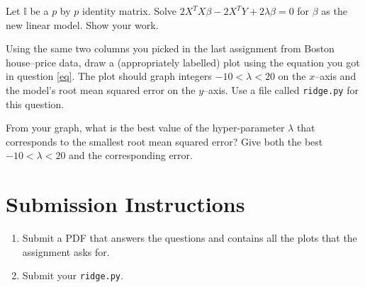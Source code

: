 \documentclass{homework}
\begin{document}
\question\label{eq} Let $\mathbb{I}$ be a $p$ by $p$ identity matrix. Solve $2X^TX\beta - 2X^TY + 2\lambda \beta = 0$ for $\beta$ as the new linear model. Show your work.

\question Using the same two columns you picked in the last assignment from Boston house--price data, draw a (appropriately labelled) plot using the equation you got in question \ref{eq}. The plot should graph integers $-10 < \lambda <20$ on the $x$--axis and the model's root mean squared error on the $y$--axis. Use a file called \texttt{ridge.py} for this question.

\question From your graph, what is the best value of the hyper-parameter $\lambda$ that corresponds to the smallest root mean squared error? Give both the best  $-10 < \lambda <20$ and the corresponding error.

\section*{Submission Instructions}

\begin{enumerate}
    \item Submit a PDF that answers the questions and contains all the plots that the assignment asks for.
    \item Submit your \texttt{ridge.py}.
\end{enumerate}
\end{document}
